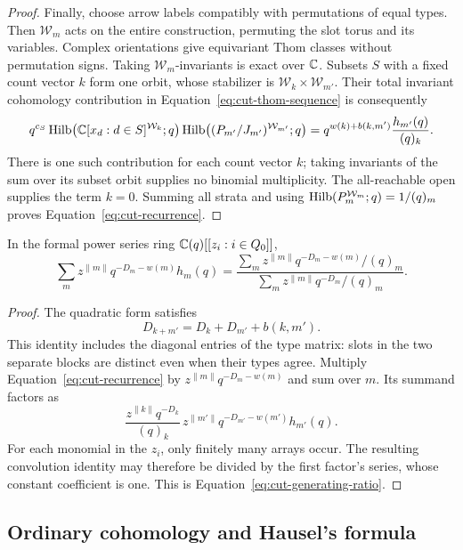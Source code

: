 \begin{proof}
Finally, choose arrow labels compatibly with permutations of equal types.
Then $\mathcal W_m$ acts on the entire construction, permuting the slot
torus and its variables.  Complex orientations give equivariant Thom
classes without permutation signs.  Taking $\mathcal W_m$-invariants is
exact over $\mathbb C$.  Subsets $S$ with a fixed count vector $k$ form one orbit,
whose stabilizer is $\mathcal W_k\times\mathcal W_{m'}$.  Their total
invariant cohomology contribution in
Equation~\eqref{eq:cut-thom-sequence} is consequently
\[
 q^{c_S}
 \operatorname{Hilb}\bigl(\mathbb C[x_d:d\in S]^{\mathcal W_k};q\bigr)
 \operatorname{Hilb}\bigl((P_{m'}/J_{m'})^{\mathcal W_{m'}};q\bigr)
 =q^{w(k)+b(k,m')}\frac{h_{m'}(q)}{(q)_k}.
\]
There is one such contribution for each count vector $k$; taking invariants
of the sum over its subset orbit supplies no binomial multiplicity.
The all-reachable open supplies the term $k=0$.  Summing all strata and
using $\operatorname{Hilb}(P_m^{\mathcal W_m};q)=1/(q)_m$ proves
Equation~\eqref{eq:cut-recurrence}.
\end{proof}

\begin{corollary}\label{cor:cut-generating-ratio}
In the formal power series ring $\mathbb C(q)[[z_i:i\in Q_0]]$,
\begin{equation}\label{eq:cut-generating-ratio}
 \sum_m z^{\|m\|}q^{-D_m-w(m)}h_m(q)
 =
 \frac{\displaystyle\sum_m
       z^{\|m\|}q^{-D_m-w(m)}/(q)_m}
      {\displaystyle\sum_m z^{\|m\|}q^{-D_m}/(q)_m}.
\end{equation}
\end{corollary}

\begin{proof}
The quadratic form satisfies
\[
 D_{k+m'}=D_k+D_{m'}+b(k,m').
\]
This identity includes the diagonal entries of the type matrix: slots in
the two separate blocks are distinct even when their types agree.
Multiply Equation~\eqref{eq:cut-recurrence} by
$z^{\|m\|}q^{-D_m-w(m)}$ and sum over $m$.  Its summand factors as
\[
 \frac{z^{\|k\|}q^{-D_k}}{(q)_k}\,
 z^{\|m'\|}q^{-D_{m'}-w(m')}h_{m'}(q).
\]
For each monomial in the $z_i$, only finitely many arrays occur.  The
resulting convolution identity may therefore be divided by the first
factor's series, whose constant coefficient is one.  This is
Equation~\eqref{eq:cut-generating-ratio}.
\end{proof}

\subsection{Ordinary cohomology and Hausel's formula}

